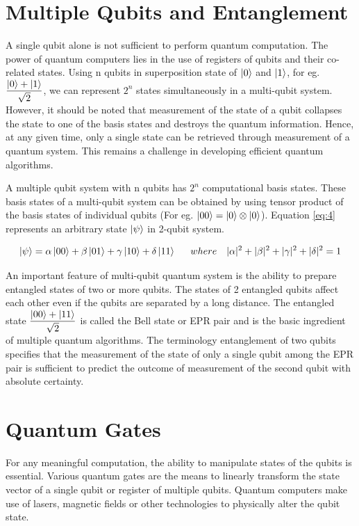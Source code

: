 \documentclass[english,a4paper,11pt,oneside,onecolumn]{book}
\begin{document}
\section{Multiple Qubits and Entanglement}
\label{sec:multiQubit}
A single qubit alone is not sufficient to perform quantum computation. The power of quantum computers lies in the use of registers of qubits and their co-related states. Using n qubits in superposition state of $\ket{0}$ and $\ket{1}$, for eg. \(\dfrac{\ket{0} + \ket{1}}{\sqrt{2}}\), we can represent \(2^n\) states simultaneously in a multi-qubit system. However, it should be noted that measurement of the state of a qubit collapses the state to one of the basis states and destroys the quantum information. Hence, at any given time, only a single state can be retrieved through measurement of a quantum system. This remains a challenge in developing efficient quantum algorithms.

A multiple qubit system with n qubits has \(2^n\) computational basis states. These basis states of a multi-qubit system can be obtained by using tensor product of the basis states of individual qubits (For eg. \(\ket{00} = \ket{0}\otimes\ket{0}\)). Equation \ref{eq:4} represents an arbitrary state $\ket{\psi}$ in 2-qubit system. 

\begin{equation}\label{eq:4}
    \ket{\psi} = \alpha\ket{00} + \beta\ket{01} + \gamma\ket{10} + \delta\ket{11} \hspace{15pt} where \hspace{10pt} |\alpha|^2 + |\beta|^2 + |\gamma|^2 + |\delta|^2 = 1
\end{equation}

An important feature of multi-qubit quantum system is the ability to prepare entangled states of two or more qubits. The states of 2 entangled qubits affect each other even if the qubits are separated by a long distance. The entangled state \(\dfrac{\ket{00} + \ket{11}}{\sqrt{2}}\) is called the Bell state or EPR pair and is the basic ingredient of multiple quantum algorithms. The terminology entanglement of two qubits specifies that the measurement of the state of only a single qubit among the EPR pair is sufficient to predict the outcome of measurement of the second qubit with absolute certainty.

\section{Quantum Gates}
\label{sec:qGates}
For any meaningful computation, the ability to manipulate states of the qubits is essential. Various quantum gates are the means to linearly transform the state vector of a single qubit or register of multiple qubits. Quantum computers make use of lasers, magnetic fields or other technologies to physically alter the qubit state.
\end{document}
